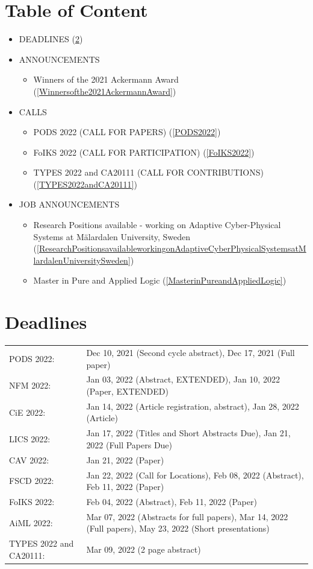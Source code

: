 \documentclass[prodmode,acmtecs]{acmsmall} %
\begin{document}
\section{Table of Content}\begin{itemize}\item DEADLINES (\cref{deadlines}) 
 
\item ANNOUNCEMENTS 
 
\begin{itemize}\item Winners of the 2021 Ackermann Award (\cref{Winnersofthe2021AckermannAward})
\end{itemize} 
\item CALLS 
 
\begin{itemize}\item PODS 2022 (CALL FOR PAPERS) (\cref{PODS2022})
\item FoIKS 2022 (CALL FOR PARTICIPATION) (\cref{FoIKS2022})
\item TYPES 2022 and CA20111 (CALL FOR CONTRIBUTIONS) (\cref{TYPES2022andCA20111})
\end{itemize} 
\item JOB ANNOUNCEMENTS 
 
\begin{itemize}\item Research Positions available - working on Adaptive Cyber-Physical Systems at Mälardalen University, Sweden (\cref{ResearchPositionsavailableworkingonAdaptiveCyberPhysicalSystemsatMlardalenUniversitySweden})
\item Master in Pure and Applied Logic (\cref{MasterinPureandAppliedLogic})
\end{itemize} 
\end{itemize}\section{Deadlines}\label{deadlines}\begin{tabulary}{\linewidth}{LL}PODS 2022:  & Dec 10, 2021 (Second cycle abstract), Dec 17, 2021 (Full paper) \\
NFM 2022:  & Jan 03, 2022 (Abstract, EXTENDED), Jan 10, 2022 (Paper, EXTENDED) \\
CiE 2022:  & Jan 14, 2022 (Article registration, abstract), Jan 28, 2022 (Article) \\
LICS 2022:  & Jan 17, 2022 (Titles and Short Abstracts Due), Jan 21, 2022 (Full Papers Due) \\
CAV 2022:  & Jan 21, 2022 (Paper) \\
FSCD 2022:  & Jan 22, 2022 (Call for Locations), Feb 08, 2022 (Abstract), Feb 11, 2022 (Paper) \\
FoIKS 2022:  & Feb 04, 2022 (Abstract), Feb 11, 2022 (Paper) \\
AiML 2022:  & Mar 07, 2022 (Abstracts for full papers), Mar 14, 2022 (Full papers), May 23, 2022 (Short presentations) \\
TYPES 2022 and CA20111:  & Mar 09, 2022 (2 page abstract) \\
\end{tabulary}
\end{document}
